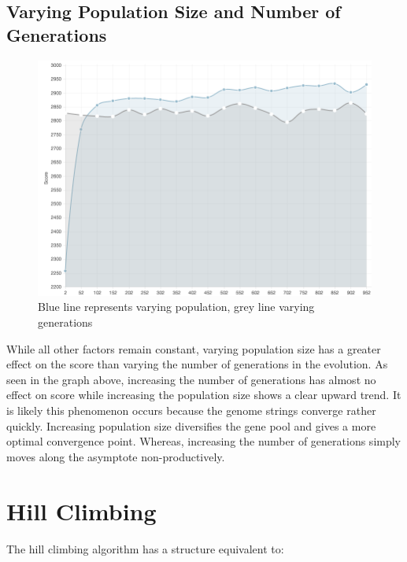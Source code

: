 \documentclass[12pt]{article}
\begin{document}
\subsection{Varying Population Size and Number of Generations}
\label{vpg}
\begin{figure}[h!]
    \centering
    \includegraphics[scale=0.5]{figures/gen_pop_compare}
    \caption{Blue line represents varying population, grey line varying generations}
\end{figure}

While all other factors remain constant,
varying population size has a greater effect on the score than varying the number
of generations in the evolution. As seen in the graph above, increasing the number
of generations has almost no effect on score while increasing the population
size shows a clear upward trend.  It is likely this phenomenon occurs because the genome
strings converge rather quickly.  Increasing population size diversifies
the gene pool and gives a more optimal convergence point. Whereas, increasing
the number of generations simply moves along the asymptote non-productively.

\section{Hill Climbing}

The hill climbing algorithm has a structure equivalent to: \\

\begin{algorithm}[H]
\end{algorithm}
\end{document}

